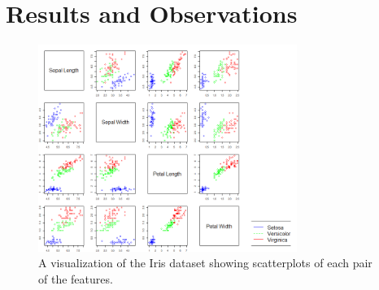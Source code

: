 \documentclass{article}
\begin{document}
\color{orange}
\section{Results and Observations}

\begin{figure}[H]
	\centering
	\includegraphics[width=0.75\textwidth]{iris_colored.png}
	\caption{A visualization of the Iris dataset showing scatterplots of each pair of the features.}
	\label{fig:iris_colored}
\end{figure}

\end{document}
